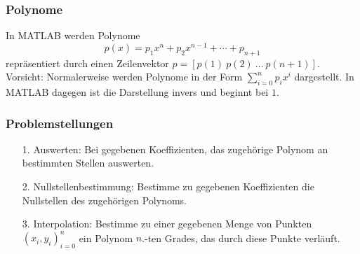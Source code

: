 %
%
\begin{frame}[fragile]\frametitle{Polynome}
In MATLAB werden Polynome
\[ p(x)=p_1 x^n+ p_2 x^{n-1}+ \cdots + p_{n+1} \]
repr\"asentiert durch einen Zeilenvektor $p=[p(1) \ p(2) \ \dots
\   p(n+1)]$. \vspace*{0.5cm}\\

\alert{ Vorsicht:} Normalerweise werden Polynome in der Form
$\sum_{i=0}^n p_ix^i$ dargestellt. In MATLAB dagegen ist die
Darstellung invers und beginnt bei $1$.
\end{frame}
%
%
\begin{frame}[fragile]\frametitle{Problemstellungen}
\begin{itemize}
\item [1.] \alert{ Auswerten:} Bei gegebenen Koeffizienten, das
  zugeh\"orige Polynom an bestimmten Stellen auswerten.
\item [2.] \alert{ Nullstellenbestimmung:} Bestimme zu gegebenen
  Koeffizienten die Nullstellen des zugeh\"origen Polynoms.
\item [3.]  \alert{ Interpolation}: Bestimme zu einer gegebenen Menge von
  Punkten $(x_i,y_i)_{i=0}^n$ ein Polynom $n$.-ten Grades, das durch
  diese Punkte verl\"auft.
\end{itemize}
\end{frame}
%
%
